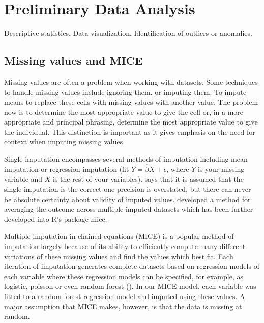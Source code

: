\documentclass[12pt]{article}
\begin{document}
\section{Preliminary Data Analysis}

\label{s.pda}

Descriptive statistics.
Data visualization.
Identification of outliers or anomalies.


\subsection{Missing values and MICE}
	
	Missing values are often a problem when working with datasets. Some techniques to handle missing values include ignoring them, or imputing them. To impute means to replace these cells with missing values with another value. The problem now is to determine the most appropriate value to give the cell or, in a more appropriate and principal phrasing, determine the most appropriate value to give the individual. This distinction is important as it gives emphasis on the need for context when imputing missing values.
	
	Single imputation encompasses several methods of imputation including mean imputation or regression imputation (fit $Y= \widehat\beta X + \epsilon$, where $Y$ is your missing variable and $X$ is the rest of your variables). \cite{jadhav1} says that it is assumed that the single imputation is the correct one precision is overstated, but there can never be absolute certainty about validity of imputed values. \cite{rubin1} developed a method for averaging the outcome across multiple imputed datasets which has been further developed into \textsf{R}'s package \textsf{mice}.
	
	Multiple imputation in chained equations (MICE) is a popular method of imputation largely because of its ability to efficiently compute many different variations of these missing values and find the values which best fit. Each iteration of imputation generates complete datasets based on regression models of each variable where these regression models can be specified, for example, as logistic, poisson or even random forest (\cite{mice1}). In our MICE model, each variable was fitted to a random forest regression model and imputed using these values. A major assumption that MICE makes, however, is that the data is missing at random.
	
\end{document}
